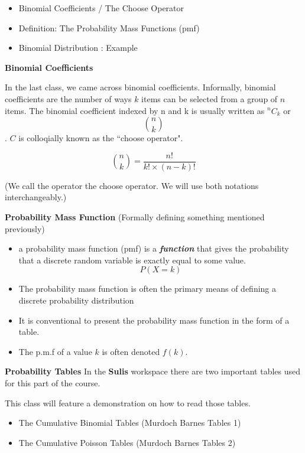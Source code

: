 
{
\begin{itemize}
\item  Binomial Coefficients / The Choose Operator
\item  Definition: The Probability Mass Functions (pmf)
\item  Binomial Distribution : Example
\end{itemize}
}
{
\textbf{Binomial Coefficients}

In the last class, we came across binomial coefficients. Informally, binomial coefficients are the number of ways $k$ items can be selected from a group of $n$ items. 
The binomial coefficient indexed by n and k is usually written as $^nC_k$ or
\[ {n \choose k}\].
$C$ is colloqially known as the ``choose operator".

\[ {n \choose k} = \frac{n!}{k! \times (n-k)!} \]

(We call the operator the choose operator. We will use both notations interchangeably.)


{
\textbf{Probability Mass Function}
(Formally defining something mentioned previously)
\begin{itemize} \item  a probability mass function (pmf) is a \textbf{\emph{function}}
that gives the probability that a discrete random variable is exactly equal to some
value.
\[P(X=k)\]
\item  The probability mass function is often the primary means of defining a discrete
probability distribution
\item  It is conventional to present the probability mass function in the form of a table.
\item  The p.m.f of a value $k$ is often denoted $f(k)$.
\end{itemize}
}
{
\textbf{Probability Tables}
In the \textbf{Sulis} workspace there are two important tables used for this part of the course.


This class will feature a demonstration on how to read those tables.
\begin{itemize}
\item  The Cumulative Binomial Tables (Murdoch Barnes Tables 1)
\item  The Cumulative Poisson Tables (Murdoch Barnes Tables 2)
\end{itemize}

}}
